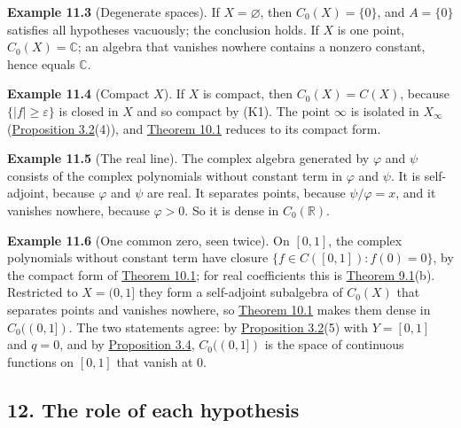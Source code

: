 \documentclass[
  english,
  11pt,
  a4paper,
]{article}
\begin{document}
\textbf{Example 11.3} (Degenerate spaces). If \(X=\varnothing\), then
\(C_0(X)=\{0\}\), and \(A=\{0\}\) satisfies all hypotheses vacuously;
the conclusion holds. If \(X\) is one point, \(C_0(X)=\mathbb C\); an
algebra that vanishes nowhere contains a nonzero constant, hence equals
\(\mathbb C\).

\textbf{Example 11.4} (Compact \(X\)). If \(X\) is compact, then
\(C_0(X)=C(X)\), because \(\{|f|\geq\varepsilon\}\) is closed in \(X\)
and so compact by (K1). The point \(\infty\) is isolated in \(X_\infty\)
(\hyperlink{the-stone-weierstrass-theorem-for-functions-vanishing-at-infinity--oa-fnd-sw-02}{Proposition
3.2}(4)), and
\hyperlink{the-stone-weierstrass-theorem-for-functions-vanishing-at-infinity--oa-fnd-sw-09}{Theorem
10.1} reduces to its compact form.

\textbf{Example 11.5} (The real line). The complex algebra generated by
\(\varphi\) and \(\psi\) consists of the complex polynomials without
constant term in \(\varphi\) and \(\psi\). It is self-adjoint, because
\(\varphi\) and \(\psi\) are real. It separates points, because
\(\psi/\varphi=x\), and it vanishes nowhere, because \(\varphi>0\). So
it is dense in \(C_0(\mathbb R)\).

\textbf{Example 11.6} (One common zero, seen twice). On \([0,1]\), the
complex polynomials without constant term have closure
\(\{f\in C([0,1]):f(0)=0\}\), by the compact form of
\hyperlink{the-stone-weierstrass-theorem-for-functions-vanishing-at-infinity--oa-fnd-sw-09}{Theorem
10.1}; for real coefficients this is
\hyperlink{the-stone-weierstrass-theorem-for-functions-vanishing-at-infinity--oa-fnd-sw-07}{Theorem
9.1}(b). Restricted to \(X=(0,1]\) they form a self-adjoint subalgebra
of \(C_0(X)\) that separates points and vanishes nowhere, so
\hyperlink{the-stone-weierstrass-theorem-for-functions-vanishing-at-infinity--oa-fnd-sw-09}{Theorem
10.1} makes them dense in \(C_0((0,1])\). The two statements agree: by
\hyperlink{the-stone-weierstrass-theorem-for-functions-vanishing-at-infinity--oa-fnd-sw-02}{Proposition
3.2}(5) with \(Y=[0,1]\) and \(q=0\), and by
\hyperlink{the-stone-weierstrass-theorem-for-functions-vanishing-at-infinity--oa-fnd-sw-03}{Proposition
3.4}, \(C_0((0,1])\) is the space of continuous functions on \([0,1]\)
that vanish at \(0\).

\subsection[12. The role of each
hypothesis]{\texorpdfstring{\protect\hypertarget{the-stone-weierstrass-theorem-for-functions-vanishing-at-infinity--oa-fnd-sw-10}{}{}\protect\hypertarget{the-stone-weierstrass-theorem-for-functions-vanishing-at-infinity--OA-FND-SW-11}{}{}\protect\hypertarget{the-stone-weierstrass-theorem-for-functions-vanishing-at-infinity--oa-fnd-sw-11}{}{}12.
The role of each
hypothesis}{12. The role of each hypothesis}}\label{the-stone-weierstrass-theorem-for-functions-vanishing-at-infinity--OA-FND-SW-10}
\end{document}
